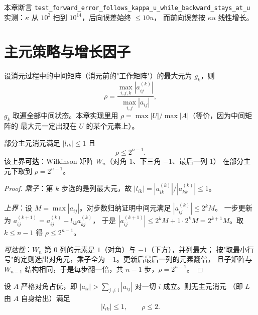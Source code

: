 本章断言 \texttt{test\_\allowbreak{}forward\_\allowbreak{}error\_\allowbreak{}follows\_\allowbreak{}kappa\_\allowbreak{}u\_\allowbreak{}while\_\allowbreak{}backward\_\allowbreak{}stays\_\allowbreak{}at\_\allowbreak{}u}
实测：$\kappa$ 从 $10^2$ 扫到 $10^{14}$，后向误差始终 $\le10u$，
而前向误差按 $\kappa u$ 线性增长。

\section{主元策略与增长因子}
\label{sec:pivot}

\begin{definition}[增长因子]
\label{def:growth}
设消元过程中的中间矩阵（消元前的"工作矩阵"）的最大元为 $g_k$，则
\begin{equation}
  \rho=\frac{\max_{i,j,k}|a^{(k)}_{ij}|}{\max_{i,j}|a_{ij}|},
\end{equation}
$g_k$ 取遍全部中间状态。本章实现里用 $\rho=\max|U|/\max|A|$（等价，因为中间矩阵的
最大元一定出现在 $U$ 的某个元素上）。
\end{definition}

\begin{theorem}[部分主元的上界及其可达性]
\label{thm:growth-bound}
部分主元消元满足 $|l_{ik}|\le1$ 且
\begin{equation}
  \rho\le 2^{n-1}.
  \label{eq:growthbound}
\end{equation}
该上界\textbf{可达}：Wilkinson 矩阵 $W_n$（对角 $1$、下三角 $-1$、最后一列 $1$）
在部分主元下取到 $\rho=2^{n-1}$。
\end{theorem}

\begin{proof}
\emph{乘子}：第 $k$ 步选的是列最大元，故 $|l_{ik}|=|a_{ik}^{(k)}|/|a_{kk}^{(k)}|\le1$。

\emph{上界}：设 $M=\max|a_{ij}|$。对步数归纳证明中间元满足 $|a^{(k)}_{ij}|\le2^kM$。
一步更新为 $a^{(k+1)}_{ij}=a^{(k)}_{ij}-l_{ik}a^{(k)}_{kj}$，
于是 $|a^{(k+1)}_{ij}|\le2^kM+1\cdot2^kM=2^{k+1}M$。取 $k\le n-1$ 得 $\rho\le2^{n-1}$。

\emph{可达性}：$W_n$ 第 $0$ 列的元素是 $1$（对角）与 $-1$（下方），并列最大；
按"取最小行号"的定则选出对角元，乘子全为 $-1$。更新后最后一列的元素翻倍，
且子矩阵与 $W_{n-1}$ 结构相同，于是每步翻一倍，共 $n-1$ 步，$\rho=2^{n-1}$。
\end{proof}

\begin{theorem}
\label{thm:dd}
设 $A$ 严格对角占优，即 $|a_{ii}|>\sum_{j\ne i}|a_{ij}|$ 对一切 $i$ 成立。则无主元消元
（即 $L$ 由 $A$ 自身给出）满足
\begin{equation}
  |l_{ik}|\le1,\qquad \rho\le2 .
\end{equation}
\end{theorem}

